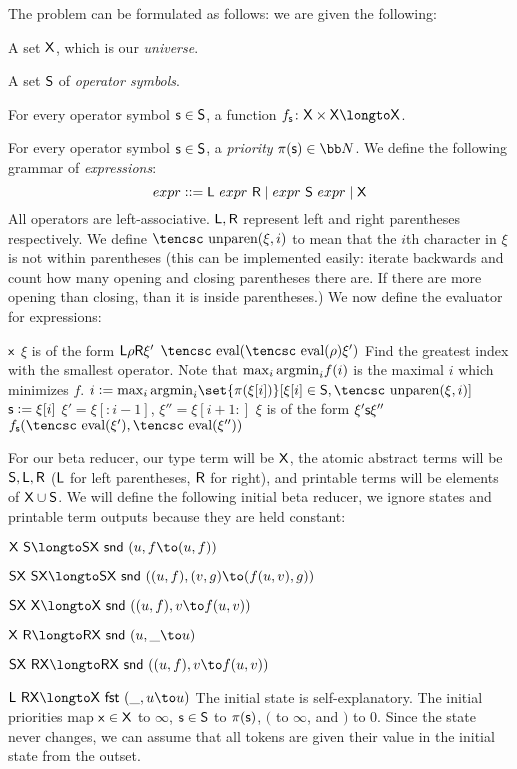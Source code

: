 The problem can be formulated as follows: we are given the following:
\benum
    \item A set ${\sf X}$, which is our {\it universe}.
    \item A set ${\sf S}$ of {\it operator symbols}.
    \item For every operator symbol ${\sf s}\in{\sf S}$, a function $f_{\s s}\colon\s X\times\s X\longto\s X$.
    \item For every operator symbol ${\sf s}\in{\sf S}$, a {\it priority} $\pi(\s s)\in{\bb N}$.
\eenum
We define the following grammar of {\it expressions}:
$$ {\sl expr} \mathrel{{\mathop:}{\mathop:}{=}} {\sf L}\ {\sl expr}\ {\sf R} \mid {\sl expr}\ {\sf S}\ {\sl expr} \mid {\sf X} $$
\def\unparen{\hbox{\tencsc unparen}}%
All operators are left-associative.
${\sf L},{\sf R}$ represent left and right parentheses respectively.
We define $\unparen(\xi,i)$ to mean that the $i$th character in $\xi$ is not within parentheses (this can be implemented easily: iterate backwards and count how many opening and closing parentheses there
are.
If there are more opening than closing, than it is inside parentheses.)
We now define the evaluator for expressions:

\def\eval{\hbox{\tencsc eval}}
\algorithm
{}
        \State\Return ${\sf x}$
        \State $\xi$ is of the form ${\sf L}\rho{\sf R}\xi'$
        \State\Return $\eval(\eval(\rho)\xi')$
    \Else
        \Comment Find the greatest index with the smallest operator.\cr
        Note that $\max_i{\rm argmin}_if(i)$ is the maximal $i$ which minimizes $f$.\EndComment
        \State $i\coloneqq\max_i{\rm argmin}_i\set{\pi(\xi[i])}[{\xi[i]\in\s S,\unparen(\xi,i)}]$
        \State ${\sf s}\mathrel{{\mathop:}{=}}\xi[i]$
        \Comment $\xi'=\xi[:i-1]$, $\xi''=\xi[i+1:]$ \EndComment
        \State $\xi$ is of the form $\xi'{\sf s}\xi''$
        \State\Return $f_{\s s}(\eval(\xi'),\eval(\xi''))$
    \EndIf
\EndFunc
\ealgorithm

For our beta reducer, our type term will be ${\sf X}$, the atomic abstract terms will be ${\sf S},{\sf L},{\sf R}$ (${\sf L}$ for left parentheses, ${\sf R}$ for right), and printable terms will be elements of ${\sf X}\cup{\sf S}$.
We will define the following initial beta reducer, we ignore states and printable term outputs because they are held constant:
\blist
    \item $\s X\ \s S\longto\s S\s X\ \snd\ (u,f\to(u,f))$
    \item $\s S\s X\ \s S\s X \longto\s S\s X\ \snd\ ((u,f),(v,g)\to(f(u,v),g))$
    \item $\s S\s X\ \s X\longto\s X\ \snd\ ((u,f),v\to f(u,v))$
    \item $\s X\ \s R \longto \s R\s X\ \snd\ (u,\_\to u)$
    \item $\s S\s X\ \s R\s X \longto\s R\s X\ \snd\ ((u,f),v\to f(u,v))$
    \item $\s L\ \s R\s X \longto\s X\ \fst\ (\_,u\to u)$
\elist
\noindent The initial state is self-explanatory.
The initial priorities map ${\sf x}\in{\sf X}$ to $\infty$, ${\sf s}\in{\sf S}$ to $\pi({\sf s})$, $($ to $\infty$, and $)$ to $0$.
Since the state never changes, we can assume that all tokens are given their value in the initial state from the outset.

